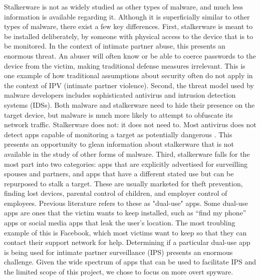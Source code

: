 \documentclass[acmtog]{acmart}
\begin{document}
Stalkerware is not as widely studied as other types of malware, and much less 
information is available regarding it. Although it is superficially 
similar to other types of malware, there exist a few key differences. First, 
stalkerware is meant to be installed 
deliberately, by someone with physical access to the device that is to be 
monitored. In the context of intimate partner abuse, this presents an enormous 
threat. An abuser will often know or be able to coerce passwords to the device 
from the victim, making traditional defense measures irrelevant. This is one 
example of how traditional assumptions about security often do not apply in the 
context of IPV (intimate partner violence). Second, the 
threat model used by malware developers includes sophisticated antivirus and 
intrusion detection systems (IDSs). Both malware and stalkerware need to hide 
their presence on the target device, but malware is much more likely to 
attempt to obfuscate its network traffic. Stalkerware does not: it does not 
need to. Most antivirus does not detect apps capable of monitoring a target as 
potentially dangerous \cite{chatterjee_spyware_2018}. This presents an 
opportunity to glean information about stalkerware that is not available in the 
study of other forms of malware. Third, stalkerware falls 
for the most part into two categories: apps that are explicitly advertised for 
surveilling spouses and partners, and apps that have a different stated use but 
can be repurposed to stalk a target. These are usually marketed for theft 
prevention, finding lost devices, parental control of children, and employer 
control of employees. Previous literature refers to these as "dual-use" 
apps\cite{chatterjee_spyware_2018}. Some dual-use apps are ones that the 
victim wants to keep installed, such as 
``find my phone'' apps or social media apps that leak the user's location. The 
most troubling example of this is Facebook, which most victims want to keep 
so that they can contact their support network for help.  Determining if a 
particular dual-use app is being used for intimate partner surveillance (IPS) 
presents an enormous challenge. Given the wide spectrum of apps that can be 
used to facilitate IPS and the limited scope of this project, we chose to focus 
on more overt spyware.
\end{document}
